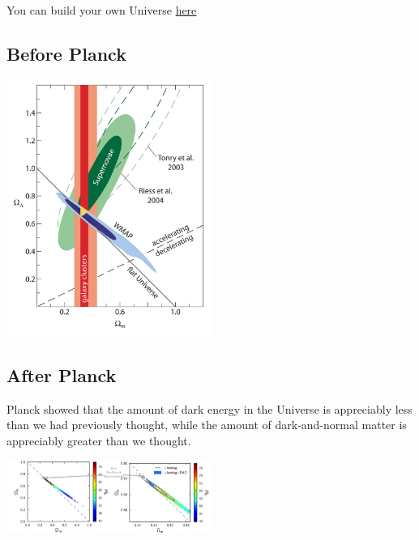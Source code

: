\documentclass[
  letterpaper,
  DIV=11,
  numbers=noendperiod]{scrreprt}
\begin{document}
\begin{tcolorbox}[enhanced jigsaw, colframe=quarto-callout-note-color-frame, leftrule=.75mm, left=2mm, opacitybacktitle=0.6, colbacktitle=quarto-callout-note-color!10!white, coltitle=black, arc=.35mm, titlerule=0mm, toprule=.15mm, opacityback=0, bottomrule=.15mm, breakable, bottomtitle=1mm, rightrule=.15mm, toptitle=1mm, colback=white, title=\textcolor{quarto-callout-note-color}{\faInfo}\hspace{0.5em}{Build your own Universe}]

You can build your own Universe
\href{https://lambda.gsfc.nasa.gov/education/cmb_plotter/}{here}

\end{tcolorbox}

\subsection{Before Planck}\label{before-planck}

\begin{center}
\includegraphics[width=0.5\textwidth,height=\textheight]{images/eso0419d.jpg}
\end{center}

\subsection{After Planck}\label{after-planck}

Planck showed that the amount of dark energy in the Universe is
appreciably less than we had previously thought, while the amount of
dark-and-normal matter is appreciably greater than we thought.

\begin{center}
\includegraphics[width=0.5\textwidth,height=\textheight]{images/Lambda_Matter.jpg}
\end{center}
\end{document}
